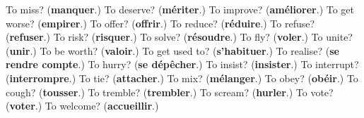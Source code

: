 \begin{tcolorbox}[breakable,colback=teal!4,colframe=teal!35!black,title={Before you move on}]
To miss? (\textbf{manquer}.) To deserve? (\textbf{mériter}.) To improve? (\textbf{améliorer}.) To get worse? (\textbf{empirer}.) To offer? (\textbf{offrir}.) To reduce? (\textbf{réduire}.) To refuse? (\textbf{refuser}.) To risk? (\textbf{risquer}.) To solve? (\textbf{résoudre}.) To fly? (\textbf{voler}.) To unite? (\textbf{unir}.) To be worth? (\textbf{valoir}.) To get used to? (\textbf{s'habituer}.) To realise? (\textbf{se rendre compte}.) To hurry? (\textbf{se dépêcher}.) To insist? (\textbf{insister}.) To interrupt? (\textbf{interrompre}.) To tie? (\textbf{attacher}.) To mix? (\textbf{mélanger}.) To obey? (\textbf{obéir}.) To cough? (\textbf{tousser}.) To tremble? (\textbf{trembler}.) To scream? (\textbf{hurler}.) To vote? (\textbf{voter}.) To welcome? (\textbf{accueillir}.)
\end{tcolorbox}
